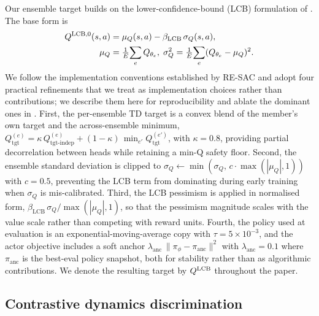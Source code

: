 Our ensemble target builds on the lower-confidence-bound (LCB) formulation of \citet{an2021uncertainty}.
The base form is
\begin{equation}
\begin{aligned}
Q^{\mathrm{LCB},0}(s, a) &= \mu_Q(s, a) - \beta_{\text{LCB}}\,\sigma_Q(s, a), \\
\mu_Q &= \tfrac{1}{E}\!\sum_{e} Q_{\theta_e}, \;
\sigma_Q^2 = \tfrac{1}{E}\!\sum_{e} (Q_{\theta_e} - \mu_Q)^2.
\end{aligned}
\label{eq:lcb}
\end{equation}
We follow the implementation conventions established by RE-SAC \citep{an2021uncertainty} and adopt four practical refinements that we treat as implementation choices rather than contributions; we describe them here for reproducibility and ablate the dominant ones in .
First, the per-ensemble TD target is a convex blend of the member's own target and the across-ensemble minimum,
$Q_{\text{tgt}}^{(e)} = \kappa\,Q^{(e)}_{\text{tgt-indep}} + (1-\kappa)\,\min_{e'} Q^{(e')}_{\text{tgt}}$,
with $\kappa = 0.8$, providing partial decorrelation between heads while retaining a min-Q safety floor.
Second, the ensemble standard deviation is clipped to $\sigma_Q \leftarrow \min(\sigma_Q,\,c\cdot \max(|\mu_Q|, 1))$ with $c = 0.5$, preventing the LCB term from dominating during early training when $\sigma_Q$ is mis-calibrated.
Third, the LCB pessimism is applied in normalised form, $\beta_{\text{LCB}}\,\sigma_Q / \max(|\mu_Q|, 1)$, so that the pessimism magnitude scales with the value scale rather than competing with reward units.
Fourth, the policy used at evaluation is an exponential-moving-average copy with $\tau = 5\!\times\!10^{-3}$, and the actor objective includes a soft anchor $\lambda_{\text{anc}}\,\lVert \pi_\phi - \pi_{\text{anc}} \rVert^2$ with $\lambda_{\text{anc}} = 0.1$ where $\pi_{\text{anc}}$ is the best-eval policy snapshot, both for stability rather than as algorithmic contributions.
We denote the resulting target by $Q^{\mathrm{LCB}}$ throughout the paper.

\subsection{Contrastive dynamics discrimination}
\label{sec:method:contrastive}

